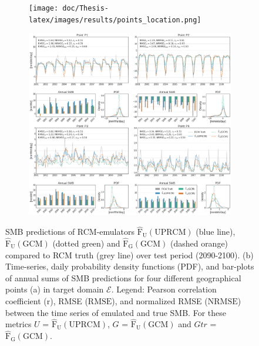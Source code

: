 \documentclass[a4paper,11pt,oneside]{report}
\begin{document}
\begin{figure}[!h]
        \centering
        \begin{subfigure}[b]{0.2\columnwidth}
            \centering \texttt{[image: doc/Thesis-latex/images/results/points\_location.png]}
            \caption[]%
            {{\small}}    
          \label{fig:points-location}
        \end{subfigure}
        \hfill
        \begin{subfigure}[b]{\columnwidth}  
            \centering 
           \includegraphics[width=\textwidth]{doc/Thesis-latex/images/results/timeseries_RCM_GCM.pdf}
            \caption[]%
            {{\small }}  
          \label{fig:timeseries-GCM-UPRCM}
        \end{subfigure}
        \hfill
        \caption[]
        {\small SMB predictions of RCM-emulators $\mathrm{\hat{F}_{U}(UPRCM)}$ (blue line), $\mathrm{\hat{F}_{U}(GCM)}$ (dotted green) and $\mathrm{\mathrm{\hat{F}_{G}(GCM)}}$ (dashed orange) compared to RCM truth (grey line) over test period (2090-2100). 
        (b) Time-series, daily probability density functions (PDF), and bar-plots of annual sums of SMB predictions for four different geographical points (a) in target domain $\mathcal{E}$.
        Legend: Pearson correlation coefficient ($\mathrm{r}$), RMSE ($\mathrm{RMSE}$), and normalized RMSE ($\mathrm{NRMSE}$) between the time series of emulated and true SMB. For these metrics $U$ = $\mathrm{\hat{F}_{U}(UPRCM)}$, $G$ = $\mathrm{\hat{F}_{U}(GCM)}$ and $Gtr$ = $\mathrm{\hat{F}_{G}(GCM)}$.} 
        \label{fig:points-timeseries-GCM-UPRCM}
    \end{figure}
\end{document}
